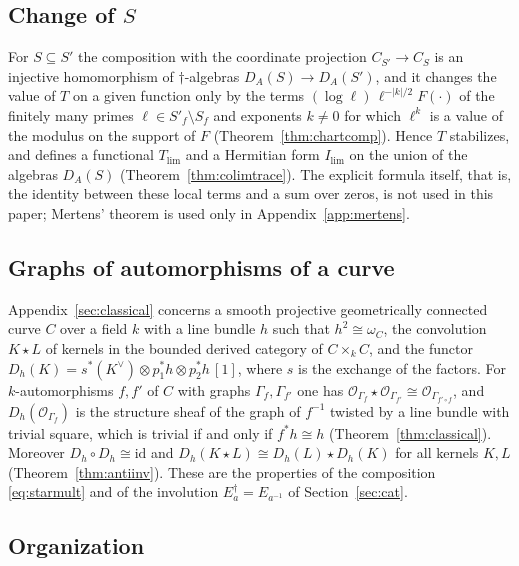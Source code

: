 \documentclass[11pt]{amsart}
\theoremstyle{definition}
\theoremstyle{remark}
\begin{document}
\subsection*{Change of $S$}

For $S\subseteq S'$ the composition with the coordinate projection
$C_{S'}\to C_S$ is an injective homomorphism of $\dagger$-algebras
$D_A(S)\to D_A(S')$, and it changes the value of $T$ on a given function only
by the terms $(\log\ell)\,\ell^{-|k|/2}F(\cdot)$ of the finitely many primes
$\ell\in S'_f\setminus S_f$ and exponents $k\ne0$ for which $\ell^{k}$ is a
value of the modulus on the support of $F$ (Theorem~\ref{thm:chartcomp}).
Hence $T$ stabilizes, and defines a functional $T_{\lim}$ and a Hermitian
form $I_{\lim}$ on the union of the algebras $D_A(S)$
(Theorem~\ref{thm:colimtrace}).  The explicit formula itself, that is, the
identity between these local terms and a sum over zeros, is not used in this
paper; Mertens' theorem is used only in Appendix~\ref{app:mertens}.

\subsection*{Graphs of automorphisms of a curve}

Appendix~\ref{sec:classical} concerns a smooth projective geometrically
connected curve $C$ over a field $k$ with a line bundle $h$ such that
$h^{2}\cong\omega_C$, the convolution $K\star L$ of kernels in the bounded
derived category of $C\times_kC$, and the functor
$D_h(K)=s^{*}(K^{\vee})\otimes p_1^{*}h\otimes p_2^{*}h\,[1]$, where $s$ is
the exchange of the factors.  For $k$-automorphisms $f,f'$ of $C$ with graphs
$\Gamma_f,\Gamma_{f'}$ one has
$\mathcal O_{\Gamma_f}\star\mathcal O_{\Gamma_{f'}}\cong
\mathcal O_{\Gamma_{f'\circ f}}$, and $D_h(\mathcal O_{\Gamma_f})$ is the
structure sheaf of the graph of $f^{-1}$ twisted by a line bundle with
trivial square, which is trivial if and only if $f^{*}h\cong h$
(Theorem~\ref{thm:classical}).  Moreover $D_h\circ D_h\cong\mathrm{id}$ and
$D_h(K\star L)\cong D_h(L)\star D_h(K)$ for all kernels $K,L$
(Theorem~\ref{thm:antiinv}).  These are the properties of the composition
\eqref{eq:starmult} and of the involution $E_a^{\dagger}=E_{a^{-1}}$ of
Section~\ref{sec:cat}.

\subsection*{Organization}
\end{document}
